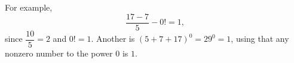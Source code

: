 For example,
\[
\boxed{\dfrac{17-7}{5}-0!=1},
\]
since $\dfrac{10}{5}=2$ and $0!=1$. Another is $(5+7+17)^0=29^0=1$, using that any nonzero number to the power $0$ is $1$.

